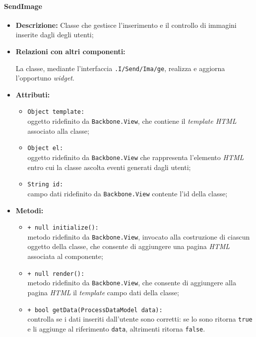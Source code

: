 \paragraph{SendImage}
\label{sendImage}
\begin{flushleft}
\begin{itemize}
\item \textbf{Descrizione:} Classe che gestisce l'inserimento e il controllo di immagini inserite dagli degli utenti;
\item \textbf{Relazioni con altri componenti:}
\begin{sloppypar}
La classe, mediante l'interfaccia \texttt{\viewUser{}.I\fshyp{}Send\fshyp{}Ima\fshyp{}ge}, realizza e aggiorna l'opportuno \textit{widget}.
\end{sloppypar}
\item \textbf{Attributi:}
\begin{sloppypar}
\begin{itemize}
\item \texttt{Object template:}\\ oggetto ridefinito da \texttt{Backbone.View}, che contiene il \textit{template HTML} associato alla classe;
\item \texttt{Object el:}\\ oggetto ridefinito da \texttt{Backbone.View} che rappresenta l'elemento \textit{HTML} entro cui la classe ascolta eventi generati dagli utenti;
\item \texttt{String id:}\\ campo dati ridefinito da \texttt{Backbone.View} contente l'id della classe;
\end{itemize}
\end{sloppypar}
\item \textbf{Metodi:}
\begin{sloppypar}
\begin{itemize}
\item \texttt{+ null initialize():}\\ metodo ridefinito da \texttt{Backbone.View}, invocato alla costruzione di ciascun oggetto della classe, che consente di aggiungere una pagina \textit{HTML} associata al componente;
\item \texttt{+ null render():}\\ metodo ridefinito da \texttt{Backbone.View}, che consente di aggiungere alla pagina \textit{HTML} il \textit{template} campo dati della classe;
\item \texttt{+ bool getData(ProcessDataModel data):}\\ controlla se i dati inseriti dall'utente sono corretti: se lo sono ritorna \texttt{true} e li aggiunge al riferimento \texttt{data}, altrimenti ritorna \texttt{false}.
\end{itemize}
\end{sloppypar}
\end{itemize}
\end{flushleft}

